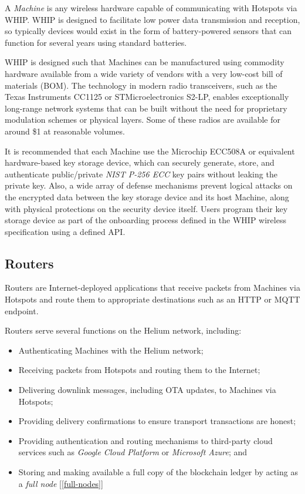 \documentclass[10pt, nonatbib, nocopyrightspace, reprint]{sigplanconf}
\newcommand{\secref}[1]{[\autoref{#1}]}
\begin{document}
A \emph{Machine} is any wireless hardware capable of communicating with Hotspots via WHIP. WHIP is designed to facilitate low power data transmission and reception, so typically devices would exist in the form of battery-powered sensors that can function for several years using standard batteries.

WHIP is designed such that Machines can be manufactured using commodity hardware available from a wide variety of vendors with a very low-cost bill of materials (BOM). The technology in modern radio transceivers, such as the Texas Instruments CC1125 or STMicroelectronics S2-LP, enables exceptionally long-range network systems that can be built without the need for proprietary modulation schemes or physical layers. Some of these radios are available for around \$1 at reasonable volumes.

It is recommended that each Machine use the Microchip ECC508A or equivalent hardware-based key storage device, which can securely generate, store, and authenticate public/private \emph{NIST P-256 ECC} \cite{nist} key pairs without leaking the private key. Also, a wide array of defense mechanisms prevent logical attacks on the encrypted data between the key storage device and its host Machine, along with physical protections on the security device itself. Users program their key storage device as part of the onboarding process defined in the WHIP wireless specification using a defined API\@.

\subsection{Routers}

Routers are Internet-deployed applications that receive packets from Machines via Hotspots and route them to appropriate destinations such as an HTTP or MQTT endpoint.

Routers serve several functions on the Helium network, including:

\begin{itemize}
    \item Authenticating Machines with the Helium network;
    \item Receiving packets from Hotspots and routing them to the Internet;
    \item Delivering downlink messages, including OTA updates, to Machines via Hotspots;
    \item Providing delivery confirmations to ensure transport transactions are honest;
    \item Providing authentication and routing mechanisms to third-party cloud services such as \emph{Google Cloud Platform} or \emph{Microsoft Azure}; and
    \item Storing and making available a full copy of the blockchain ledger by acting as a \emph{full node} \secref{full-nodes}
\end{itemize}
\end{document}
